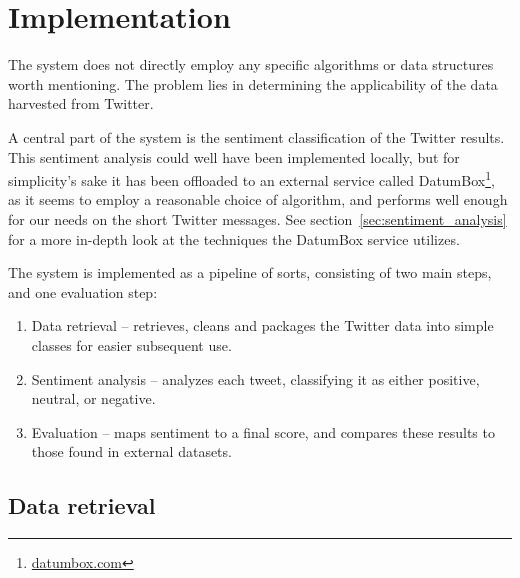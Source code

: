 
\chapter{Implementation} %

\label{Chapter5} %




The system does not directly employ any specific algorithms or data structures worth mentioning.
The problem lies in determining the applicability of the data harvested from Twitter.

A central part of the system is the sentiment classification of the Twitter results.
This sentiment analysis could well have been implemented locally, but for simplicity's sake it has been offloaded to an external service called DatumBox\footnote{\url{datumbox.com}}, as it seems to employ a reasonable choice of algorithm, and performs well enough for our needs on the short Twitter messages.
See section~\ref{sec:sentiment_analysis} for a more in-depth look at the techniques the DatumBox service utilizes.

The system is implemented as a pipeline of sorts, consisting of two main steps, and one evaluation step:
\begin{enumerate}
  \item Data retrieval -- retrieves, cleans and packages the Twitter data into simple classes for easier subsequent use.
  \item Sentiment analysis -- analyzes each tweet, classifying it as either positive, neutral, or negative.
  \item Evaluation -- maps sentiment to a final score, and compares these results to those found in external datasets.
\end{enumerate}

\section{Data retrieval} %
\label{sec:data_retrieval}

